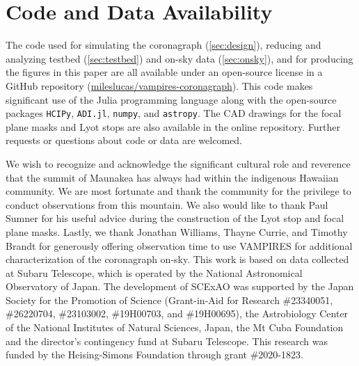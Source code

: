 \documentclass[]{spie}  %
\begin{document}
\appendix    %


\section{Code and Data Availability}\label{sec:code}

The code used for simulating the coronagraph (\autoref{sec:design}), reducing and analyzing testbed (\autoref{sec:testbed}) and on-sky data (\autoref{sec:onsky}), and for producing the figures in this paper are all available under an open-source license in a GitHub repository (\href{https://github.com/mileslucas/vampires-coronagraph}{mileslucas/vampires-coronagraph}). This code makes significant use of the Julia programming language\cite{bezanson2017} along with the open-source packages \texttt{HCIPy}\cite{por2018}, \texttt{ADI.jl}\cite{lucas2020}, \texttt{numpy}\cite{harris2020}, and \texttt{astropy}\cite{astropycollaboration2013,astropycollaboration2018}. The CAD drawings for the focal plane masks and Lyot stops are also available in the online repository. Further requests or questions about code or data are welcomed.

\acknowledgments

We wish to recognize and acknowledge the significant cultural role and reverence that the summit of Maunakea has always had within the indigenous Hawaiian community. We are most fortunate and thank the community for the privilege to conduct observations from this mountain. We also would like to thank Paul Sumner for his useful advice during the construction of the Lyot stop and focal plane masks. Lastly, we thank Jonathan Williams, Thayne Currie, and Timothy Brandt for generously offering observation time to use VAMPIRES for additional characterization of the coronagraph on-sky. This work is based on data collected at Subaru Telescope, which is operated by the National Astronomical Observatory of Japan. The development of SCExAO was supported by the Japan Society for the Promotion of Science (Grant-in-Aid for Research \#23340051, \#26220704, \#23103002, \#19H00703, and \#19H00695), the Astrobiology Center of the National Institutes of Natural Sciences, Japan, the Mt Cuba Foundation and the director's contingency fund at Subaru Telescope. This research was funded by the Heising-Simons Foundation through grant \#2020-1823.


\end{document}

